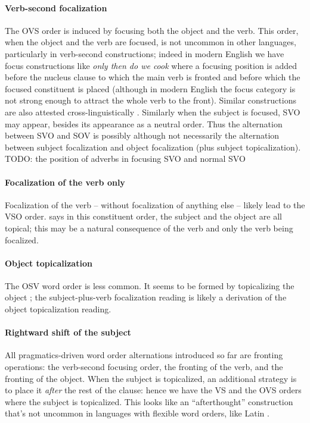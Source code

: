 \documentclass[a4paper, oneside, 12pt]{report}
\newcommand*{\citetable}[1]{Table~{#1}}
\newcommand*{\citepage}[1]{p.~{#1}}
\newcommand{\form}[1]{\emph{#1}}
\begin{document}
\paragraph*{Verb-second focalization}
The OVS order is induced by focusing both the object and the verb.
This order, when the object and the verb are focused, 
is not uncommon in other languages, particularly in verb-second constructions;
indeed in modern English we have focus constructions like 
\form{only then do we cook} 
where a focusing position is added before the nucleus clause 
to which the main verb is fronted and before which the focused constituent is placed
(although in modern English the focus category is not strong enough 
to attract the whole verb to the front).
Similar constructions are also attested cross-linguistically \citep[\citepage{521}]{forker2020grammar}.
Similarly when the subject is focused, SVO may appear, 
besides its appearance as a neutral order.
Thus the alternation between SVO and SOV is possibly although not necessarily 
the alternation between subject focalization and object focalization (plus subject topicalization).
TODO: the position of adverbs in focusing SVO and normal SVO

\paragraph*{Focalization of the verb only}
Focalization of the verb -- without focalization of anything else -- likely lead to the VSO order.
\citet[\citetable{27.1}]{forker2020grammar} says in this constituent order, 
the subject and the object are all topical; 
this may be a natural consequence of the verb and only the verb being focalized.

\paragraph*{Object topicalization}
The OSV word order is less common.
It seems to be formed by topicalizing the object \citep[\citepage{522}]{forker2020grammar}; 
the subject-plus-verb focalization reading is likely a derivation 
of the object topicalization reading.

\paragraph*{Rightward shift of the subject}\label{sec:overview.information.rightward}
All pragmatics-driven word order alternations introduced so far are fronting operations: 
the verb-second focusing order, 
the fronting of the verb, and the fronting of the object.
When the subject is topicalized, an additional strategy is to place it \emph{after} the rest of the clause: 
hence we have the VS and the OVS orders where the subject is topicalized.
This looks like an ``afterthought'' construction that's 
not uncommon in languages with flexible word orders, 
like Latin \citep[\citepage{39}]{devine2006latin}.
\end{document}
